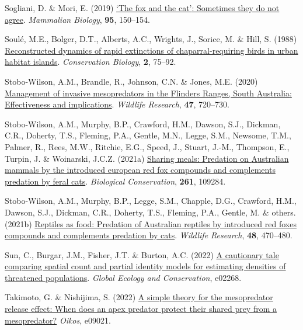 \documentclass[preprint, 3p, authoryear]{elsarticle} %
\newlength{\cslhangindent}
\newlength{\cslentryspacingunit} %
\newenvironment{CSLReferences}[2] %
 {%
  \setlength{\parindent}{0pt}
  \ifodd #1
  \let\oldpar\par
  \def\par{\hangindent=\cslhangindent\oldpar}
  \fi
  \setlength{\parskip}{#2\cslentryspacingunit}
 }%
 {}
\begin{document}
\begin{CSLReferences}{1}{0}
\leavevmode{}%
Sogliani, D. \& Mori, E. (2019) \href{https://doi.org/10.1016/j.mambio.2018.07.003}{{`The fox and the cat'}: Sometimes they do not agree}. \emph{Mammalian Biology}, \textbf{95}, 150--154.

\leavevmode{}%
Soulé, M.E., Bolger, D.T., Alberts, A.C., Wrights, J., Sorice, M. \& Hill, S. (1988) \href{https://doi.org/10.1111/j.1523-1739.1988.tb00337.x}{Reconstructed dynamics of rapid extinctions of chaparral-requiring birds in urban habitat islands}. \emph{Conservation Biology}, \textbf{2}, 75--92.

\leavevmode{}%
Stobo-Wilson, A.M., Brandle, R., Johnson, C.N. \& Jones, M.E. (2020) \href{https://doi.org/10.1071/WR19237}{Management of invasive mesopredators in the {Flinders Ranges, South {A}ustralia}: Effectiveness and implications}. \emph{Wildlife Research}, \textbf{47}, 720--730.

\leavevmode{}%
Stobo-Wilson, A.M., Murphy, B.P., Crawford, H.M., Dawson, S.J., Dickman, C.R., Doherty, T.S., Fleming, P.A., Gentle, M.N., Legge, S.M., Newsome, T.M., Palmer, R., Rees, M.W., Ritchie, E.G., Speed, J., Stuart, J.-M., Thompson, E., Turpin, J. \& Woinarski, J.C.Z. (2021a) \href{https://doi.org/10.1016/j.biocon.2021.109284}{Sharing meals: Predation on {{A}ustralian} mammals by the introduced european red fox compounds and complements predation by feral cats}. \emph{Biological Conservation}, \textbf{261}, 109284.

\leavevmode{}%
Stobo-Wilson, A.M., Murphy, B.P., Legge, S.M., Chapple, D.G., Crawford, H.M., Dawson, S.J., Dickman, C.R., Doherty, T.S., Fleming, P.A., Gentle, M. \& others. (2021b) \href{https://doi.org/10.1071/WR20194}{Reptiles as food: Predation of {{A}ustralian} reptiles by introduced red foxes compounds and complements predation by cats}. \emph{Wildlife Research}, \textbf{48}, 470--480.

\leavevmode{}%
Sun, C., Burgar, J.M., Fisher, J.T. \& Burton, A.C. (2022) \href{https://doi.org/10.1016/j.gecco.2022.e02268}{A cautionary tale comparing spatial count and partial identity models for estimating densities of threatened populations}. \emph{Global Ecology and Conservation}, e02268.

\leavevmode{}%
Takimoto, G. \& Nishijima, S. (2022) \href{\%20https://doi.org/10.1111/oik.09021}{A simple theory for the mesopredator release effect: When does an apex predator protect their shared prey from a mesopredator?} \emph{Oikos}, e09021.


\end{CSLReferences}
\end{document}
